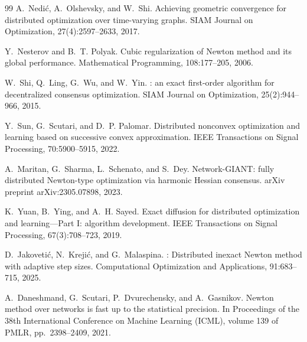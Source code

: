 \documentclass[review,onefignum,onetabnum]{siamart171218}
\begin{document}
\begin{thebibliography}{99}
		A.~Nedi{\'c}, A.~Olshevsky, and W.~Shi.
		\newblock Achieving geometric convergence for distributed optimization over time-varying graphs.
		\newblock SIAM Journal on Optimization, 27(4):2597--2633, 2017.
		
		Y.~Nesterov and B.~T. Polyak.
		\newblock Cubic regularization of {N}ewton method and its global performance.
		\newblock Mathematical Programming, 108:177--205, 2006.
		
		W.~Shi, Q.~Ling, G.~Wu, and W.~Yin.
		: an exact first-order algorithm for decentralized consensus optimization.
		\newblock SIAM Journal on Optimization, 25(2):944--966, 2015.
		
		Y.~Sun, G.~Scutari, and D.~P. Palomar.
		\newblock Distributed nonconvex optimization and learning based on successive convex approximation.
		\newblock IEEE Transactions on Signal Processing, 70:5900--5915, 2022.
		
		A.~Maritan, G.~Sharma, L.~Schenato, and S.~Dey.
		\newblock Network-{GIANT}: fully distributed {N}ewton-type optimization via harmonic {H}essian consensus.
		\newblock arXiv preprint arXiv:2305.07898, 2023.
		
		K.~Yuan, B.~Ying, and A.~H. Sayed.
		\newblock Exact diffusion for distributed optimization and learning---Part {I}: algorithm development.
		\newblock IEEE Transactions on Signal Processing, 67(3):708--723, 2019.
		
		
		D.~Jakoveti{\'c}, N.~Kreji{\'c}, and G.~Malaspina.
		: Distributed inexact {N}ewton method with adaptive step sizes.
		\newblock Computational Optimization and Applications, 91:683--715, 2025.
		
		A.~Daneshmand, G.~Scutari, P.~Dvurechensky, and A.~Gasnikov.
		\newblock Newton method over networks is fast up to the statistical precision.
		\newblock In Proceedings of the 38th International Conference on Machine Learning (ICML), volume 139 of PMLR, pp.~2398--2409, 2021.
		

\end{thebibliography}
\end{document}

